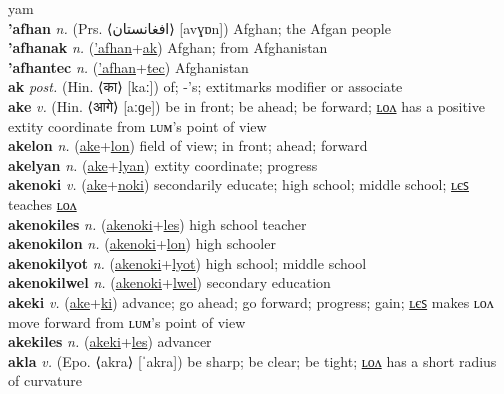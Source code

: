 yam \label{'aflika'yewlasiatulsetupel} \\
\textbf{'afhan} \textit{n.} (Prs. ⟨افغانستان‬⟩ [avɣɒn])
Afghan; the Afgan people \label{'afhan} \\
\textbf{'afhanak} \textit{n.} (\hyperref['afhan]{'afhan}+\hyperref[ak]{ak})
Afghan; from Afghanistan \label{'afhanak} \\
\textbf{'afhantec} \textit{n.} (\hyperref['afhan]{'afhan}+\hyperref[tec]{tec})
Afghanistan \label{'afhantec} \\
\textbf{ak} \textit{post.} (Hin. ⟨का⟩ [kaː])
of; -'s; 	extit{marks modifier or associate} \label{ak} \\
\textbf{ake} \textit{v.} (Hin. ⟨आगे⟩ [aːɡe])
be in front; be ahead; be forward; \hyperref[akelon]{ʟᴏᴧ} has a positive 	extit{y} coordinate from ʟᴜᴍ's point of view \label{ake} \\
\textbf{akelon} \textit{n.} (\hyperref[ake]{ake}+\hyperref[lon]{lon})
field of view; in front; ahead; forward \label{akelon} \\
\textbf{akelyan} \textit{n.} (\hyperref[ake]{ake}+\hyperref[lyan]{lyan})
	extit{y} coordinate; progress \label{akelyan} \\
\textbf{akenoki} \textit{v.} (\hyperref[ake]{ake}+\hyperref[noki]{noki})
secondarily educate; high school; middle school; \hyperref[akenokiles]{ʟєꜱ} teaches \hyperref[akenokilon]{ʟᴏᴧ} \label{akenoki} \\
\textbf{akenokiles} \textit{n.} (\hyperref[akenoki]{akenoki}+\hyperref[les]{les})
high school teacher \label{akenokiles} \\
\textbf{akenokilon} \textit{n.} (\hyperref[akenoki]{akenoki}+\hyperref[lon]{lon})
high schooler \label{akenokilon} \\
\textbf{akenokilyot} \textit{n.} (\hyperref[akenoki]{akenoki}+\hyperref[lyot]{lyot})
high school; middle school \label{akenokilyot} \\
\textbf{akenokilwel} \textit{n.} (\hyperref[akenoki]{akenoki}+\hyperref[lwel]{lwel})
secondary education \label{akenokilwel} \\
\textbf{akeki} \textit{v.} (\hyperref[ake]{ake}+\hyperref[ki]{ki})
advance; go ahead; go forward; progress; gain; \hyperref[akekiles]{ʟєꜱ} makes ʟᴏᴧ move forward from ʟᴜᴍ's point of view \label{akeki} \\
\textbf{akekiles} \textit{n.} (\hyperref[akeki]{akeki}+\hyperref[les]{les})
advancer \label{akekiles} \\
\textbf{akla} \textit{v.} (Epo. ⟨akra⟩ [ˈakra])
be sharp; be clear; be tight; \hyperref[aklalon]{ʟᴏᴧ} has a short radius of curvature \label{akla} \\
